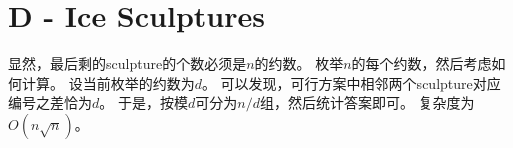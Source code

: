 \section{D - Ice Sculptures}
显然，最后剩的sculpture的个数必须是$n$的约数。
枚举$n$的每个约数，然后考虑如何计算。
设当前枚举的约数为$d$。
可以发现，可行方案中相邻两个sculpture对应编号之差恰为$d$。
于是，按模$d$可分为$n/d$组，然后统计答案即可。
复杂度为$O(n\sqrt{n})$。
